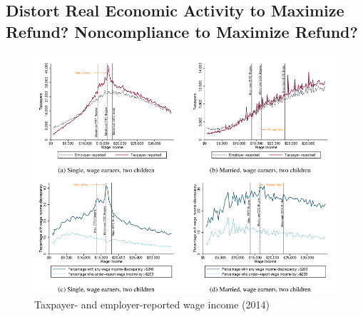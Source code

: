\documentclass[../root]{subfiles}
\begin{document}
    \subsection{Distort Real Economic Activity to Maximize Refund? Noncompliance to Maximize Refund?}

    \begin{figure}[t]
        \centering
        \includegraphics[width = 0.8\linewidth]{0626kato/fig8.PNG}
        \caption{Taxpayer- and employer-reported wage income (2014)}
        \label{fig8}
    \end{figure}
    
\end{document}
